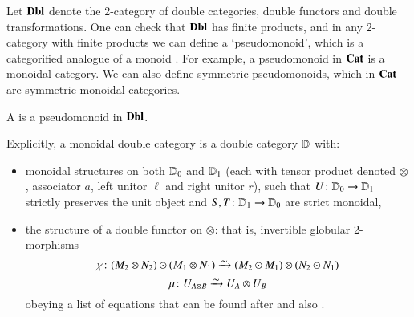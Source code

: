 \documentclass[reqno]{amsart}
\begin{document}
Let $\mathbf{Dbl}$ denote the 2-category of double categories, double functors and double transformations. One can check that $\mathbf{Dbl}$ has finite products, and in any 2-category with finite products we can define a `pseudomonoid', which is a categorified analogue of a monoid \cite{DS}. For example, a pseudomonoid in $\mathbf{Cat}$ is a monoidal category.   We can also define symmetric pseudomonoids, which in $\mathbf{Cat}$ are symmetric monoidal categories.

\begin{defn}
\label{defn:monoidal_double_category}
A  is a pseudomonoid in $\mathbf{Dbl}$. 
\end{defn} 
\noindent
Explicitly, a monoidal double category is a double category $\mathbf{\mathbb D}$ with:
\begin{itemize}
\item monoidal structures on both $\mathbf{\mathbb D}_0$ and $\mathbf{\mathbb D}_1$ (each with tensor product denoted $\otimes$, associator $a$, left unitor $\ell$ and right unitor $r$), such that $U \colon \mathbf{\mathbb D}_0 \to \mathbf{\mathbb D}_1$ strictly preserves the unit object and $S,T \colon \mathbf{\mathbb D}_1 \to \mathbf{\mathbb D}_0$ are strict monoidal,    
\item the structure of a double functor on $\otimes$:
that is, invertible globular 2-morphisms
\[ \chi \maps (M_2\otimes N_2)\odot(M_1\otimes N_1)  \simrightarrow
(M_2\odot M_1)\otimes (N_2\odot N_1)\]
\[ \mu \maps U_{A\otimes B} \simrightarrow U_A \otimes U_B\]
obeying a list of equations that can be found after \cite[Definition 2.10]{HS} and also \cite[Definition A.5]{BC}.
\end{itemize}
\end{document}
